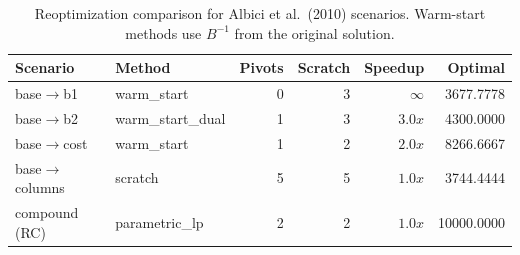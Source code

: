 \begin{table}[t]
\centering
\caption{Reoptimization comparison for Albici et al.\ (2010) scenarios. Warm-start methods use $B^{-1}$ from the original solution.}
\label{tab:reopt-comparison}
\begin{tabular}{llrrrr}
\toprule
Scenario & Method & Pivots & Scratch & Speedup & Optimal \\
\midrule
  base$\to$b1 & warm\_start & 0 & 3 & $\infty$ & 3677.7778 \\
  base$\to$b2 & warm\_start\_dual & 1 & 3 & $3.0x$ & 4300.0000 \\
  base$\to$cost & warm\_start & 1 & 2 & $2.0x$ & 8266.6667 \\
  base$\to$columns & scratch & 5 & 5 & $1.0x$ & 3744.4444 \\
  compound (RC) & parametric\_lp & 2 & 2 & $1.0x$ & 10000.0000 \\
\bottomrule
\end{tabular}
\end{table}